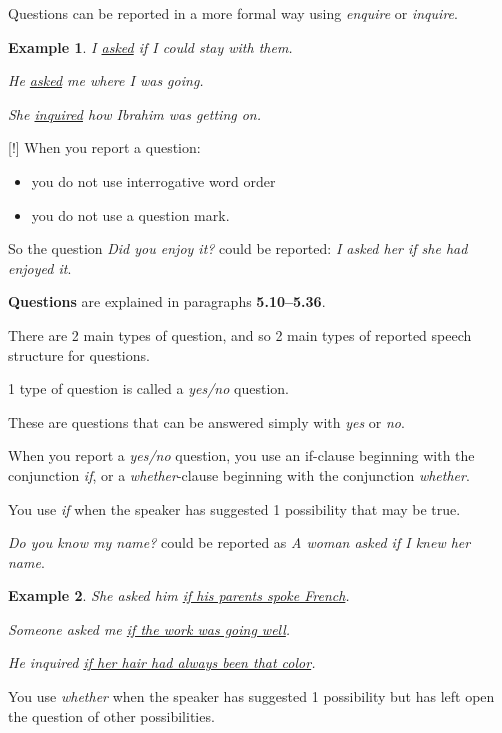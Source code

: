 \documentclass[oneside]{book}
\numberwithin{equation}{section}
\newtheorem{example}{Example}[section]
\begin{document}
Questions can be reported in a more formal way using \textit{enquire} or \textit{inquire}.
\begin{example}
    I \underline{asked} if I could stay with them.
    
    He \underline{asked} me where I was going.
    
    She \underline{inquired} how Ibrahim was getting on.
\end{example}
%
\noindent{} [!] When you report a question:
\begin{itemize}
    \item you do not use interrogative word order
    \item you do not use a question mark.
\end{itemize}
So the question \textit{Did you enjoy it?} could be reported: \textit{I asked her if she had enjoyed it}.

%
\textbf{Questions} are explained in paragraphs \textbf{5.10--5.36}.

%
\noindent{} There are 2 main types of question, and so 2 main types of reported speech structure for questions.

%
1 type of question is called a \textit{yes/no} question.

These are questions that can be answered simply with \textit{yes} or \textit{no}.

%
When you report a \textit{yes/no} question, you use an if-clause beginning with the conjunction \textit{if}, or a \textit{whether}-clause beginning with the conjunction \textit{whether}.

%
You use \textit{if} when the speaker has suggested 1 possibility that may be true.

\textit{Do you know my name?} could be reported as \textit{A woman asked if I knew her name}.
\begin{example}
    She asked him \underline{if his parents spoke French}.
    
    Someone asked me \underline{if the work was going well}.
    
    He inquired \underline{if her hair had always been that color}.
\end{example}
You use \textit{whether} when the speaker has suggested 1 possibility but has left open the question of other possibilities.
\end{document}

